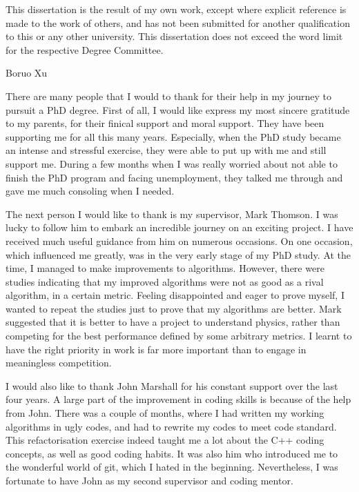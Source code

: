 \begin{declaration}
  This dissertation is the result of my own work, except where explicit
  reference is made to the work of others, and has not been submitted
  for another qualification to this or any other university. This
  dissertation does not exceed the word limit for the respective Degree
  Committee.
  \vspace*{1cm}
  \begin{flushright}
    Boruo Xu
  \end{flushright}
\end{declaration}


\begin{acknowledgements}
  There are many people that I would to thank  for their help in my journey to pursuit a PhD degree. First of all, I would like express my most sincere gratitude to my parents, for their finical support and moral support. They have been supporting me for all this many years. Especially, when the PhD study became an intense and stressful exercise, they were able to put up with me and still support me. During a few months when I was really worried about not able to finish the PhD program and facing unemployment, they talked me through and gave me much consoling  when I needed.
  
  The next person I would like to thank is my supervisor, Mark Thomson. I was lucky to follow him to embark an incredible journey on an exciting project. I have received much useful guidance from him on numerous occasions. On one occasion, which influenced me greatly, was in the very early stage of my PhD study. At the time, I managed to make improvements to algorithms. However, there were studies indicating that my improved algorithms were not as good as a rival algorithm, in a certain metric. Feeling disappointed and eager to prove myself, I wanted to repeat the studies just to prove that my algorithms are better. Mark suggested that it is better to have a project to understand physics, rather than competing for the best performance defined by some arbitrary metrics. I learnt to have the right priority in work is far more important than to engage in meaningless competition.
  
  I would also like to thank John Marshall for his constant support over the last four years. A large part of the improvement in coding skills is because of the help from John. There was a couple of months, where I had written my working algorithms in ugly codes, and had to rewrite my codes to meet \pandora code standard. This refactorisation exercise indeed taught me a lot about the C++ coding concepts, as well as good coding habits. It was also him who introduced me to the wonderful world of git, which I hated in the beginning. Nevertheless, I was fortunate to have John as my second supervisor and coding mentor.
  

\end{acknowledgements}
